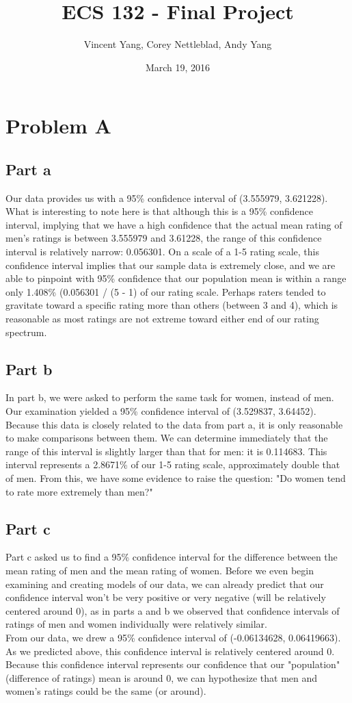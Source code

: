 \documentclass{article}
\title{ECS 132 - Final Project}
\date{March 19, 2016}
\author{Vincent Yang, Corey Nettleblad, Andy Yang}
\begin{document}
  \maketitle
  \newpage
  \section*{Problem A}

  \subsection*{Part a}
    Our data provides us with a 95\% confidence interval of (3.555979, 3.621228). What is interesting to note here is that although this is a 95\% confidence interval, implying that we have a high confidence that the actual mean rating of men's ratings is between 3.555979 and 3.61228, the range of this confidence interval is relatively narrow: 0.056301. On a scale of a 1-5 rating scale, this confidence interval implies that our sample data is extremely close, and we are able to pinpoint with 95\% confidence that our population mean is within a range only 1.408\% (0.056301 / (5 - 1) of our rating scale. Perhaps raters tended to gravitate toward a specific rating more than others (between 3 and 4), which is reasonable as most ratings are not extreme toward either end of our rating spectrum.
  \subsection*{Part b}
    In part b, we were asked to perform the same task for women, instead of men. Our examination yielded a 95\% confidence interval of (3.529837, 3.64452). Because this data is closely related to the data from part a, it is only reasonable to make comparisons between them. We can determine immediately that the range of this interval is slightly larger than that for men: it is 0.114683. This interval represents a 2.8671\% of our 1-5 rating scale, approximately double that of men. From this, we have some evidence to raise the question: "Do women tend to rate more extremely than men?"
  \subsection*{Part c}
    Part c asked us to find a 95\% confidence interval for the difference between the mean rating of men and the mean rating of women. Before we even begin examining and creating models of our data, we can already predict that our confidence interval won't be very positive or very negative (will be relatively centered around 0), as in parts a and b we observed that confidence intervals of ratings of men and women individually were relatively similar.\\
    From our data, we drew a 95\% confidence interval of (-0.06134628, 0.06419663). As we predicted above, this confidence interval is relatively centered around 0. Because this confidence interval represents our confidence that our "population" (difference of ratings) mean is around 0, we can hypothesize that men and women's ratings could be the same (or around).
\end{document}
